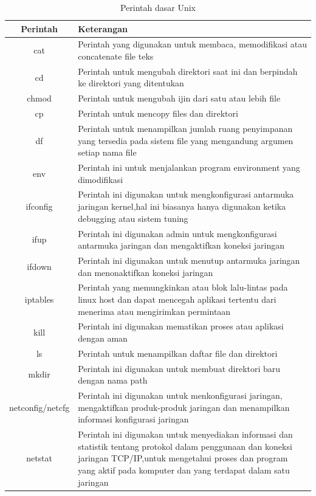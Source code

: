 \begin{table}[h]
		\caption{Perintah dasar Unix}
		\label{commands}
			\begin{tabular}{|c|l|}
			\hline
			\textbf{Perintah}& \textbf{Keterangan} \\
			\hline
			cat&Perintah yang digunakan untuk membaca, memodifikasi atau concatenate file teks\\
			\hline
			cd&Perintah untuk mengubah direktori saat ini dan berpindah ke direktori yang ditentukan\\
			\hline
			chmod&Perintah untuk mengubah ijin dari satu atau lebih file\\
			\hline
			cp&Perintah untuk mencopy files dan direktori\\
			\hline
			df&Perintah untuk menampilkan jumlah ruang penyimpanan yang tersedia pada sistem file yang mengandung argumen setiap nama file\\
			\hline
			env&Perintah ini untuk menjalankan program environment yang dimodifikasi\\
			\hline
			ifconfig&Perintah ini digunakan untuk mengkonfigurasi antarmuka jaringan kernel,hal ini biasanya hanya digunakan ketika debugging atau sistem tuning\\
			\hline
			ifup&Perintah ini digunakan admin untuk mengkonfigurasi antarmuka jaringan dan mengaktifkan koneksi jaringan\\
			\hline
			ifdown&Perintah ini digunakan untuk menutup antarmuka jaringan dan menonaktifkan koneksi jaringan\\
			\hline
			iptables&Perintah yang memungkinkan atau blok lalu-lintas pada linux host dan dapat mencegah aplikasi tertentu dari menerima atau mengirimkan permintaan\\ 
			\hline
			kill&Perintah ini digunakan mematikan proses atau aplikasi dengan aman\\
			\hline
			ls&Perintah untuk menampilkan daftar file dan direktori\\
			\hline
			mkdir&Perintah ini digunakan untuk membuat direktori baru dengan nama path\\
			\hline
			netconfig/netcfg&Perintah ini digunakan untuk menkonfigurasi jaringan, mengaktifkan produk-produk jaringan dan menampilkan informasi konfigurasi jaringan\\
			\hline
			netstat&Perintah ini digunakan untuk menyediakan informasi dan statistik tentang protokol dalam penggunaan dan koneksi jaringan TCP/IP,untuk mengetahui proses dan program yang aktif pada komputer dan yang terdapat dalam satu jaringan\\

\end{tabular}
\end{table}
